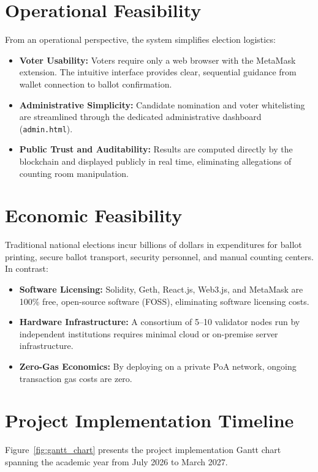 \documentclass[12pt,a4paper]{report}
\begin{document}
\clearpage
\section{Operational Feasibility}
From an operational perspective, the system simplifies election logistics:
\begin{itemize}
    \item \textbf{Voter Usability:} Voters require only a web browser with the MetaMask extension. The intuitive interface provides clear, sequential guidance from wallet connection to ballot confirmation.
    \item \textbf{Administrative Simplicity:} Candidate nomination and voter whitelisting are streamlined through the dedicated administrative dashboard (\texttt{admin.html}).
    \item \textbf{Public Trust and Auditability:} Results are computed directly by the blockchain and displayed publicly in real time, eliminating allegations of counting room manipulation.
\end{itemize}

\section{Economic Feasibility}
Traditional national elections incur billions of dollars in expenditures for ballot printing, secure ballot transport, security personnel, and manual counting centers. In contrast:
\begin{itemize}
    \item \textbf{Software Licensing:} Solidity, Geth, React.js, Web3.js, and MetaMask are 100\% free, open-source software (FOSS), eliminating software licensing costs.
    \item \textbf{Hardware Infrastructure:} A consortium of 5--10 validator nodes run by independent institutions requires minimal cloud or on-premise server infrastructure.
    \item \textbf{Zero-Gas Economics:} By deploying on a private PoA network, ongoing transaction gas costs are zero.
\end{itemize}

\clearpage
\section{Project Implementation Timeline}
Figure~\ref{fig:gantt_chart} presents the project implementation Gantt chart spanning the academic year from July 2026 to March 2027.
\end{document}
